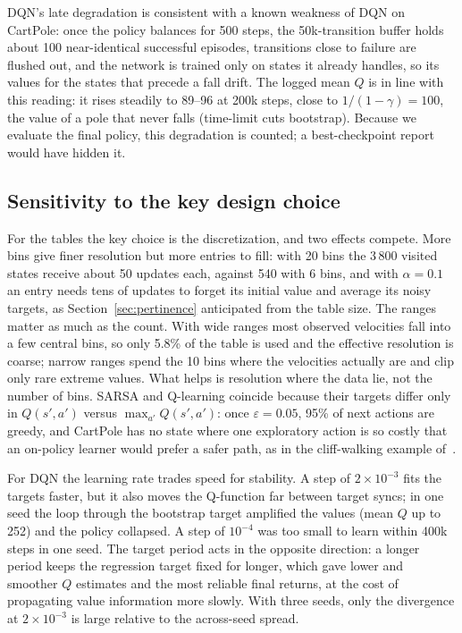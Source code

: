 \documentclass[conference]{IEEEtran}
\begin{document}
DQN's late degradation is consistent with a known weakness of DQN on CartPole: once the
policy balances for 500 steps, the 50k-transition buffer holds about 100 near-identical
successful episodes, transitions close to failure are flushed out, and the network is
trained only on states it already handles, so its values for the states that precede a
fall drift. The logged mean $Q$ is in line with this reading: it rises steadily to 89--96
at 200k steps, close to $1/(1-\gamma)=100$, the value of a pole that never falls (time-limit
cuts bootstrap). Because we evaluate the final policy, this degradation is counted; a
best-checkpoint report would have hidden it.

\subsection{Sensitivity to the key design choice}
For the tables the key choice is the discretization, and two effects compete. More bins
give finer resolution but more entries to fill: with 20 bins the 3\,800 visited states
receive about 50 updates each, against 540 with 6 bins, and with $\alpha=0.1$ an entry needs
tens of updates to forget its initial value and average its noisy targets, as
Section~\ref{sec:pertinence} anticipated from the table size. The ranges matter as much as
the count. With wide ranges most observed velocities fall into a few central bins, so only
5.8\% of the table is used and the effective resolution is coarse; narrow ranges spend the
10 bins where the velocities actually are and clip only rare extreme values. What helps is
resolution where the data lie, not the number of bins. SARSA and Q-learning coincide because
their targets differ only in $Q(s',a')$ versus $\max_{a'}Q(s',a')$: once $\varepsilon=0.05$,
95\% of next actions are greedy, and CartPole has no state where one exploratory action is
so costly that an on-policy learner would prefer a safer path, as in the cliff-walking
example of~\cite{sutton2018}.

For DQN the learning rate trades speed for stability. A step of $2\times10^{-3}$ fits the
targets faster, but it also moves the Q-function far between target syncs; in one seed the
loop through the bootstrap target amplified the values (mean $Q$ up to 252) and the policy
collapsed. A step of $10^{-4}$ was too small to learn within 400k steps in one seed. The
target period acts in the opposite direction: a longer period keeps the regression target
fixed for longer, which gave lower and smoother $Q$ estimates and the most reliable final
returns, at the cost of propagating value information more slowly. With three seeds, only
the divergence at $2\times10^{-3}$ is large relative to the across-seed spread.
\end{document}
